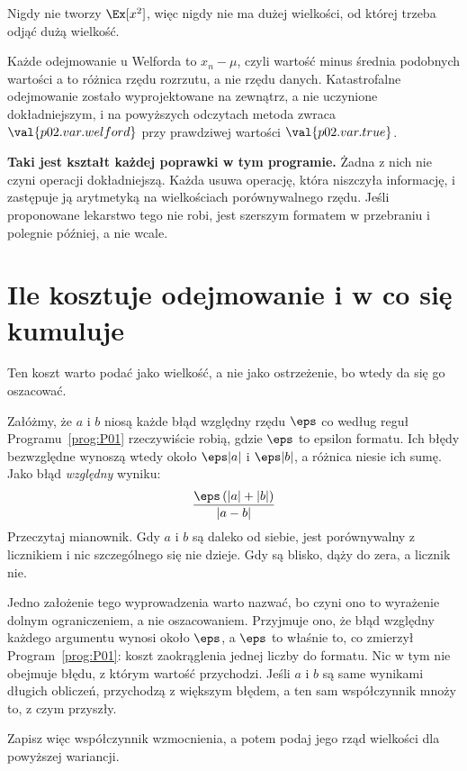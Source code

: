 \begin{fr}
\begin{ansblock}
Nigdy nie tworzy $\Ex[x^{2}]$, więc nigdy nie ma dużej wielkości, od której
trzeba odjąć dużą wielkość.
\end{ansblock}

Każde odejmowanie u Welforda to $x_n - \mu$, czyli wartość minus średnia
podobnych wartości \dash{} a to różnica rzędu rozrzutu, a nie rzędu danych.
Katastrofalne odejmowanie zostało wyprojektowane na zewnątrz, a nie
uczynione dokładniejszym, i na powyższych odczytach metoda zwraca
$\val{p02.var.welford}$ przy prawdziwej wartości $\val{p02.var.true}$.

\begin{warning}
\textbf{Taki jest kształt każdej poprawki w tym programie.} Żadna z nich nie
czyni operacji dokładniejszą. Każda usuwa operację, która niszczyła informację,
i zastępuje ją arytmetyką na wielkościach porównywalnego rzędu. Jeśli
proponowane lekarstwo tego nie robi, jest szerszym formatem w przebraniu i
polegnie później, a nie wcale.
\end{warning}
\end{fr}

\section{Ile kosztuje odejmowanie i w co się kumuluje}
\label{sec:P02-cost}

\begin{fr}
Ten koszt warto podać jako wielkość, a nie jako ostrzeżenie, bo wtedy da się go
oszacować.

Załóżmy, że $a$ i $b$ niosą każde błąd względny rzędu $\eps$ \dash{} co według
reguł Programu~\ref{prog:P01} rzeczywiście robią, gdzie $\eps$ to epsilon
formatu. Ich błędy bezwzględne wynoszą wtedy około $\eps|a|$ i $\eps|b|$, a
różnica niesie ich sumę. Jako błąd \emph{względny} wyniku:
\[ \frac{\eps\left(|a| + |b|\right)}{|a - b|} \]
Przeczytaj mianownik. Gdy $a$ i $b$ są daleko od siebie, jest porównywalny z
licznikiem i nic szczególnego się nie dzieje. Gdy są blisko, dąży do zera, a
licznik nie.

Jedno założenie tego wyprowadzenia warto nazwać, bo czyni ono to wyrażenie
dolnym ograniczeniem, a nie oszacowaniem. Przyjmuje ono, że błąd względny
każdego argumentu wynosi około $\eps$, a $\eps$ to właśnie to, co zmierzył
Program~\ref{prog:P01}: koszt zaokrąglenia jednej liczby do formatu. Nic w tym
nie obejmuje błędu, z którym wartość przychodzi. Jeśli $a$ i $b$ są same
wynikami długich obliczeń, przychodzą z większym błędem, a ten sam współczynnik
mnoży to, z czym przyszły.

Zapisz więc współczynnik wzmocnienia, a potem podaj jego rząd wielkości dla
powyższej wariancji.
\dotline
\nextframe
\end{fr}

